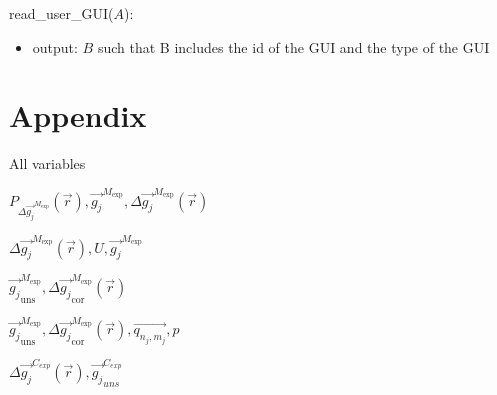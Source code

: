 \documentclass[12pt, titlepage]{article}
\begin{document}
\noindent read{\_}user{\_}GUI($A$):
\begin{itemize}
\item output:  $B$ such that B includes the id of the GUI and the type of the GUI
\end{itemize}
\bigskip




\newpage

\section{Appendix} \label{Appendix}


All variables

$P_{\Delta \overrightarrow{g_{j}}^{M_{\text{exp}}}}(\vec{r}), \overrightarrow{g_{j}}^{M_{\text{exp}}}, \Delta \overrightarrow{g_{j}}^{M_{\text{exp}}}(\vec{r})$

$\Delta \overrightarrow{g_{j}}^{M_{\text{exp}}}(\vec{r}),U,\overrightarrow{g_{j}}^{M_{\text{exp}}}$

$\overrightarrow{g_{j}}_{\text{uns}}^{M_{\text{exp}}}, \Delta\overrightarrow{g_{j}}_{\text{cor}}^{M_{\text{exp}}}(\vec{r})$

$\overrightarrow{g_{j}}_{\text{uns}}^{M_{\text{exp}}},\Delta\overrightarrow{g_{j}}_{\text{cor}}^{M_{\text{exp}}}(\vec{r}),\overrightarrow{q_{n_j,m_j}},p$

$\Delta \overrightarrow{g_{j}}^{C_{exp}}(\vec{r}),\overrightarrow{g_{j}}_{uns}^{C_{exp}}$
\end{document}
